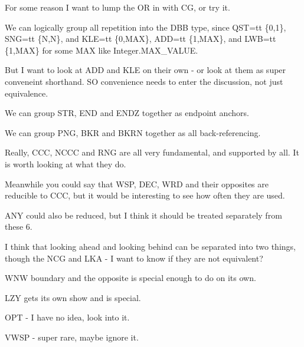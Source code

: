 For some reason I want to lump the OR in with CG, or try it.

We can logically group all repetition into the DBB type, since QST={tt \{0,1\}}, SNG={tt \{N,N\}}, and KLE={tt \{0,MAX\}}, ADD={tt \{1,MAX\}}, and LWB={tt \{1,MAX\}} for some MAX like Integer.MAX\_VALUE.

But I want to look at ADD and KLE on their own - or look at them as super conveneint shorthand.  SO convenience needs to enter the discussion, not just equivalence.

We can group STR, END and ENDZ together as endpoint anchors.

We can group PNG, BKR and BKRN together as all back-referencing.

Really, CCC, NCCC and RNG are all very fundamental, and supported by all.  It is worth looking at what they do.

Meanwhile you could say that WSP, DEC, WRD and their opposites are reducible to CCC, but it would be interesting to see how often they are used.

ANY could also be reduced, but I think it should be treated separately from these 6.

I think that looking ahead and looking behind can be separated into two things, though the NCG and LKA - I want to know if they are not equivalent?

WNW boundary and the opposite is special enough to do on its own.

LZY gets its own show and is special.

OPT - I have no idea, look into it.

VWSP - super rare, maybe ignore it.








